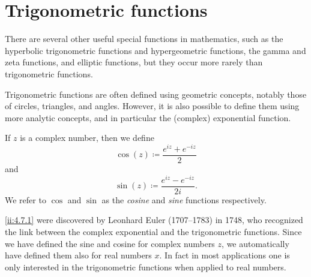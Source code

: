 \section{Trigonometric functions}\label{ii:sec:4.7}

\begin{note}
  There are several other useful special functions in mathematics, such as the hyperbolic trigonometric functions and hypergeometric functions, the gamma and zeta functions, and elliptic functions, but they occur more rarely than trigonometric functions.
\end{note}

\begin{note}
  Trigonometric functions are often defined using geometric concepts, notably those of circles, triangles, and angles.
  However, it is also possible to define them using more analytic concepts, and in particular the (complex) exponential function.
\end{note}

\begin{defn}\label{ii:4.7.1}
  If \(z\) is a complex number, then we define
  \[
    \cos(z) \coloneqq \dfrac{e^{iz} + e^{-iz}}{2}
  \]
  and
  \[
    \sin(z) \coloneqq \dfrac{e^{iz} - e^{-iz}}{2i}.
  \]
  We refer to \(\cos\) and \(\sin\) as the \emph{cosine} and \emph{sine} functions respectively.
\end{defn}

\begin{note}
  \cref{ii:4.7.1} were discovered by Leonhard Euler (1707--1783) in 1748, who recognized the link between the complex exponential and the trigonometric functions.
  Since we have defined the sine and cosine for complex numbers \(z\), we automatically have defined them also for real numbers \(x\).
  In fact in most applications one is only interested in the trigonometric functions when applied to real numbers.
\end{note}

